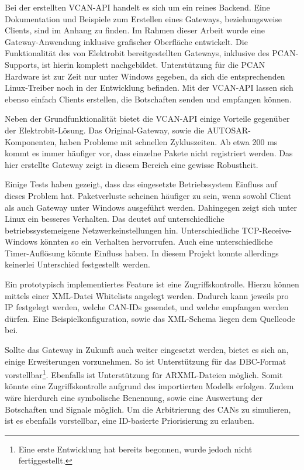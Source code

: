 \documentclass[
  a4paper,					    %
  twoside,
  DIV=calc,     				%
  bibliography=totoc,
  cleardoublepage=empty,
  ngerman,     					%
  final       					%
]{scrbook}
\begin{document}
Bei der erstellten VCAN-API handelt es sich um ein reines Backend. Eine Dokumentation und Beispiele zum Erstellen eines Gateways, beziehungsweise Clients, sind im Anhang zu finden. Im Rahmen dieser Arbeit wurde eine Gateway-Anwendung inklusive grafischer Oberfläche entwickelt. Die Funktionalität des von Elektrobit bereitgestellten Gateways, inklusive des PCAN-Supports, ist hierin komplett nachgebildet. Unterstützung für die PCAN Hardware ist zur Zeit nur unter Windows gegeben, da sich die entsprechenden Linux-Treiber noch in der Entwicklung befinden. Mit der VCAN-API lassen sich ebenso einfach Clients erstellen, die Botschaften senden und empfangen können.

Neben der Grundfunktionalität bietet die VCAN-API einige Vorteile gegenüber der Elektrobit-Lösung. Das Original-Gateway, sowie die AUTOSAR-Komponenten, haben Probleme mit schnellen Zykluszeiten. Ab etwa 200 ms kommt es immer häufiger vor, dass einzelne Pakete nicht registriert werden. Das hier erstellte Gateway zeigt in diesem Bereich eine gewisse Robustheit.

Einige Tests haben gezeigt, dass das eingesetzte Betriebssystem Einfluss auf dieses Problem hat. Paketverluste scheinen häufiger zu sein, wenn sowohl Client als auch Gateway unter Windows ausgeführt werden. Dahingegen zeigt sich unter Linux ein besseres Verhalten. Das deutet auf unterschiedliche betriebssystemeigene Netzwerkeinstellungen hin. Unterschiedliche TCP-Receive-Windows könnten so ein Verhalten hervorrufen. Auch eine unterschiedliche Timer-Auflösung könnte Einfluss haben. In diesem Projekt konnte allerdings keinerlei Unterschied festgestellt werden.

Ein prototypisch implementiertes Feature ist eine Zugriffskontrolle. Hierzu können mittels einer XML-Datei Whitelists angelegt werden. Dadurch kann jeweils pro IP festgelegt werden, welche CAN-IDs gesendet, und welche empfangen werden dürfen. Eine Beispielkonfiguration, sowie das XML-Schema liegen dem Quellcode bei.

Sollte das Gateway in Zukunft auch weiter eingesetzt werden, bietet es sich an, einige Erweiterungen vorzunehmen. So ist Unterstützung für das DBC-Format vorstellbar\footnote{Eine erste Entwicklung hat bereits begonnen, wurde jedoch nicht fertiggestellt.}. Ebenfalls ist Unterstützung für ARXML-Dateien möglich. Somit könnte eine Zugriffskontrolle aufgrund des importierten Modells erfolgen. Zudem wäre hierdurch eine symbolische Benennung, sowie eine Auswertung der Botschaften und Signale möglich. Um die Arbitrierung des CANs zu simulieren, ist es ebenfalls vorstellbar, eine ID-basierte Priorisierung zu erlauben.
\end{document}
